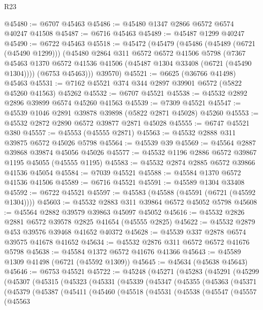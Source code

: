 \begin{lexlean}{R23}
\begin{coremodule}
@45480 := @6707 @45463
@45486 := @45480 @1347 @2866 @6572 @6574 @40247 @41508
@45487 := @6716 @45463
@45489 := @45487 @1299 @40247
@45490 := @6722 @45463
@45518 := @45472
    (@45479
      (@45486
        (@45489 (@6721 (@45490 @1299)))
        (@45480
          @2864
          @311
          @6572
          @6572
          @41506
          @5798
          (@7367 @45463 @1370 @6572 @41536 @41506 (@45487 @1304 @33408 (@6721 (@45490 @1304))))
          (@6753 @45463)))
      @39570)
@45521 := @6625 (@36766 @41498) @45463
@45531 := @7162 @45521 @374 @344 @2897 @39901 @6572 (@5822 @45260 @41563) @45262
@45532 := @6707 @45521
@45538 := @45532 @2892 @2896 @39899 @6574 @45260 @41563
@45539 := @7309 @45521
@45547 := @45539 @1046 @2891 @39878 @39898 (@5822 @2871 @45028) @45260
@45553 := @45532 @2872 @2890 @6572 @39877 @2871 @45028
@45555 := @6747 @45521 @380
@45557 := @45553 (@45555 @2871)
@45563 := @45532 @2888 @311 @39875 @6572 @45026 @5798
@45564 := @45539 @39
@45569 := @45564 @2887 @39868 @39874 @45056 @45026
@45577 := @45532 @1196 @2886 @6572 @39867 @1195 @45055 (@45555 @1195)
@45583 := @45532 @2874 @2885 @6572 @39866 @41536 @45054
@45584 := @7039 @45521
@45588 := @45584 @1370 @6572 @41536 @41506
@45589 := @6716 @45521
@45591 := @45589 @1304 @33408
@45592 := @6722 @45521
@45597 := @45583 (@45588 (@45591 (@6721 (@45592 @1304))))
@45603 := @45532 @2883 @311 @39864 @6572 @45052 @5798
@45608 := @45564 @2882 @39579 @39863 @45097 @45052
@45616 := @45532 @2826 @2881 @6572 @39578 @2825 @41654 (@45555 @2825)
@45622 := @45532 @2879 @453 @39576 @39468 @41652 @40372
@45628 := @45539 @337 @2878 @6574 @39575 @41678 @41652
@45634 := @45532 @2876 @311 @6572 @6572 @41676 @5798
@45638 := @45584 @1372 @6572 @41676 @41366
@45643 := @45589 @1309 @41498 (@6721 (@45592 @1309))
@45645 := @45634 (@45638 @45643)
@45646 := @6753 @45521
@45722 := @45248
    (@45271
      (@45283
        (@45291
          (@45299
            (@45307
              (@45315
                (@45323
                  (@45331
                    (@45339
                      (@45347
                        (@45355
                          (@45363
                            (@45371
                              (@45379
                                (@45387
                                  (@45411
                                    (@45460
                                      (@45518
                                        (@45531
                                          (@45538
                                            (@45547
                                              (@45557
                                                (@45563

\end{coremodule}
\end{lexlean}
